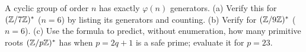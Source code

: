 \begin{exercise}
\label{ch05:ex-count-gen}
A cyclic group of order $n$ has exactly $\varphi(n)$ generators. (a) Verify this for
$(\mathbb{Z}/7\mathbb{Z})^{*}$ ($n=6$) by listing its generators and counting. (b) Verify for $(\mathbb{Z}/9\mathbb{Z})^{*}$
($n=6$). (c) Use the formula to predict, without enumeration, how many primitive roots
$(\mathbb{Z}/p\mathbb{Z})^{*}$ has when $p = 2q+1$ is a safe prime; evaluate it for $p=23$.
\end{exercise}
